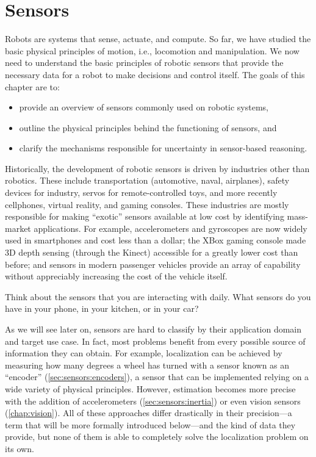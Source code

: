 \chapter{Sensors}\label{chap:sensors}

Robots are systems that sense, actuate, and compute. So far, we have studied the basic physical principles of motion, i.e., locomotion and manipulation. We now need to understand the basic principles of robotic sensors that provide the necessary data for a robot to make decisions and control itself.
%
The goals of this chapter are to:
\begin{itemize}
\item provide an overview of sensors commonly used on robotic systems,
\item outline the physical principles behind the functioning of sensors, and
\item clarify the mechanisms responsible for uncertainty in sensor-based reasoning.
\end{itemize}

Historically, the development of robotic sensors is driven by industries other than robotics. These include transportation (automotive, naval, airplanes), safety devices for industry, servos for remote-controlled toys, and more recently cellphones, virtual reality, and gaming consoles. These industries are mostly responsible for making ``exotic'' sensors available at low cost by identifying mass-market applications.
For example, accelerometers and gyroscopes are now widely used in smartphones and cost less than a dollar; the XBox gaming console made 3D depth sensing (through the Kinect) accessible for a greatly lower cost than before; and sensors in modern passenger vehicles provide an array of capability without appreciably increasing the cost of the vehicle itself.

\begin{mdframed}
Think about the sensors that you are interacting with daily. What sensors do you have in your phone, in your kitchen, or in your car?
\end{mdframed}

As we will see later on, sensors are hard to classify by their application domain and target use case. In fact, most problems benefit from every possible source of information they can obtain. For example, localization can be achieved by measuring how many degrees a wheel has turned with a sensor known as an ``encoder'' (\ref{sec:sensors:encoders}), a sensor that can be implemented relying on a wide variety of physical principles. However, estimation becomes more precise with the addition of accelerometers (\cref{sec:sensors:inertia}) or even vision sensors (\cref{chap:vision}). All of these approaches differ drastically in their precision---a term that will be more formally introduced below---and the kind of data they provide, but none of them is able to completely solve the localization problem on its own.


